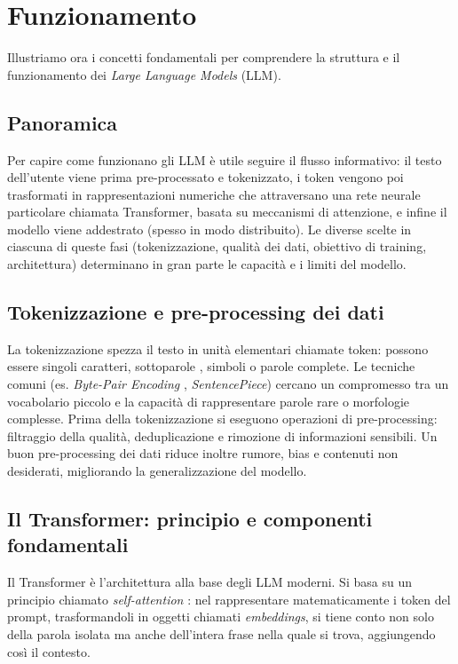 \newpage
\section{Funzionamento}

Illustriamo ora i concetti fondamentali per comprendere
la struttura e il funzionamento dei \textit{Large Language Models} (LLM).

\subsection{Panoramica}
Per capire come funzionano gli LLM è utile seguire il flusso informativo: il testo dell'utente viene prima pre-processato e tokenizzato, 
i token vengono poi trasformati in rappresentazioni numeriche che attraversano una rete neurale particolare chiamata Transformer, basata 
su meccanismi di attenzione, e infine il modello viene addestrato (spesso in modo distribuito). Le diverse scelte in ciascuna di queste fasi 
(tokenizzazione, qualità dei dati, obiettivo di training, architettura) determinano in gran parte le capacità e i limiti del modello.

\subsection{Tokenizzazione e pre-processing dei dati}
La tokenizzazione \cite{webster1992tokenization} spezza il testo in unità elementari chiamate token: possono essere singoli caratteri,
sottoparole \cite{kudo2018subword}, simboli \cite{sennrich2016neural} o parole complete. Le tecniche comuni (es. \textit{Byte-Pair Encoding} \cite{sennrich2016neural}, \textit{SentencePiece}) 
cercano un compromesso tra un vocabolario piccolo e la capacità di rappresentare parole rare o morfologie complesse. Prima della tokenizzazione 
si eseguono operazioni di pre-processing: filtraggio della qualità, deduplicazione e rimozione di informazioni sensibili. 
Un buon pre-processing dei dati riduce inoltre rumore, bias e contenuti non desiderati, migliorando la generalizzazione del modello.

\subsection{Il Transformer: principio e componenti fondamentali}
Il Transformer è l'architettura alla base degli LLM moderni. Si basa su un principio chiamato \textit{self-attention} \cite{vaswani2017attention}: 
nel rappresentare matematicamente i token del prompt, trasformandoli in oggetti chiamati \textit{embeddings}, si tiene conto non solo della parola isolata ma anche dell'intera frase 
nella quale si trova, aggiungendo così il contesto.

